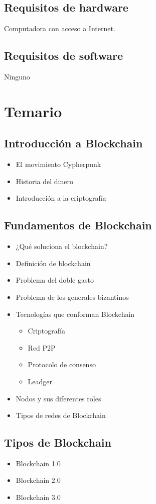 \documentclass[a4paper,12pt]{lib/pub}
\begin{document}
\subsection{Requisitos de hardware}
Computadora con acceso a Internet.

\subsection{Requisitos de software}
Ninguno

\section{Temario}

\subsection{Introducción a Blockchain}
\begin{itemize}
	\item El movimiento Cypherpunk
	\item Historia del dinero
	\item Introducción a la criptografía
\end{itemize}
\subsection{Fundamentos de Blockchain}
\begin{itemize}
	\item ¿Qué soluciona el blockchain?
	\item Definición de blockchain
	\item Problema del doble gasto
	\item Problema de los generales bizantinos
	\item Tecnologías que conforman Blockchain
	\begin{itemize}
		\item Criptografía
		\item Red P2P
		\item Protocolo de consenso
		\item Leadger
	\end{itemize}
	\item Nodos y sus diferentes roles
	\item Tipos de redes de Blockchain
\end{itemize}
\subsection{Tipos de Blockchain}
\begin{itemize}
	\item Blockchain 1.0
	\item Blockchain 2.0
	\item Blockchain 3.0
\end{itemize}\newpage
\end{document}
